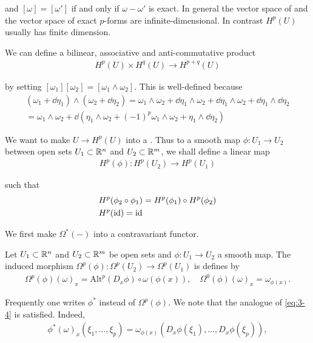 and $[\omega] = [\omega']$ if and only if $\omega-\omega'$ is exact. In general the vector space of  
and the vector space of exact $p$-forms are infinite-dimensional. In contrast $H^p(U)$ usually has finite dimension.

We can define a bilinear, associative and anti-commutative product 
\begin{align}\label{eq:3-3}
  H^p(U)\times H^q(U)\to H^{p+q}(U)
\end{align}

by setting $[\omega_1][\omega_2] = [\omega_1\wedge\omega_2]$. This is well-defined because
\begin{align*}
  (\omega_1+\dd\eta_1)\wedge(\omega_2+\dd\eta_2)
  = \omega_1\wedge\omega_2 + \dd\eta_1\wedge\omega_2 + \dd\eta_1\wedge\omega_2 + \dd\eta_1\wedge\dd\eta_2 \\
  = \omega_1\wedge\omega_2 + \dd(\eta_1\wedge\omega_2 + (-1)^p\omega_1\wedge\omega_2 + \eta_1\wedge\dd\eta_2)
\end{align*}

We want to make $U\to H^p(U)$ into a . Thus to a smooth
map $\phi:U_1\to U_2$ between open sets $U_1\subset{\ensuremath{\mathbb{R}}}^n$ and $U_2\subset{\ensuremath{\mathbb{R}}}^m$, we shall define
a linear map
\begin{align*}
  H^p(\phi): H^p(U_2)\to H^p(U_1)
\end{align*}

such that 
\begin{align}\label{eq:3-4}
\begin{aligned}
  & H^p(\phi_2\circ\phi_1) = H^p(\phi_1)\circ H^p(\phi_2)\\
  & H^p(\operatorname{id})  = \operatorname{id}
\end{aligned}
\end{align}

We first make $\Omega^*(-)$ into a contravariant functor.

\begin{definition}\label{definition:3-10}
  Let $U_1\subset{\ensuremath{\mathbb{R}}}^n$ and $U_2\subset{\ensuremath{\mathbb{R}}}^m$ be open sets and $\phi:U_1\to U_2$ a 
  smooth map. The induced morphism $\Omega^p(\phi):\Omega^p(U_2)\to \Omega^p(U_1)$ is defines by 
  \begin{align*}
    \Omega^p(\phi)(\omega)_x=\mathrm{Alt}^p(D_x\phi)\circ\omega(\phi(x)),\quad\Omega^0(\phi)(\omega)_x=\omega_{\phi(x)}.    
  \end{align*}
\end{definition}

Frequently one writes $\phi^*$ instead of $\Omega^p(\phi)$. We note that the analogue of \eqref{eq:3-4} is 
satisfied. Indeed,
\begin{align*}
  \phi^*(\omega)_x(\xi_1,\ldots,\xi_p)=\omega_{\phi(x)}(D_x\phi(\xi_1),\ldots,D_x\phi(\xi_p)),
\end{align*}

